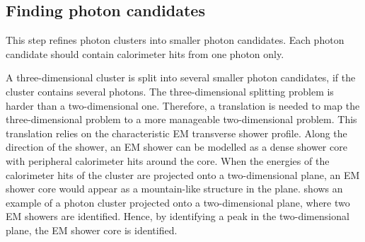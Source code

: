 \subsection{Finding photon candidates}
\label{sec:photonCandiate}

This step refines photon clusters into smaller photon candidates. Each photon candidate should contain calorimeter hits from one photon only.

A three-dimensional cluster is split into several smaller photon candidates, if the cluster contains several photons. The three-dimensional splitting problem is harder than a two-dimensional one. Therefore, a translation is needed to map the three-dimensional problem to a more manageable two-dimensional problem. This translation relies on the characteristic EM transverse shower profile. Along the direction of the shower, an EM shower can be modelled as a dense shower core with peripheral calorimeter hits around the core. When the energies of the calorimeter hits of the cluster are projected onto a two-dimensional plane, an EM shower core would appear as a mountain-like structure in the plane.  shows an example of a photon cluster projected onto a two-dimensional plane, where two EM showers are identified. Hence, by identifying a peak in the two-dimensional plane, the EM shower core is identified.





